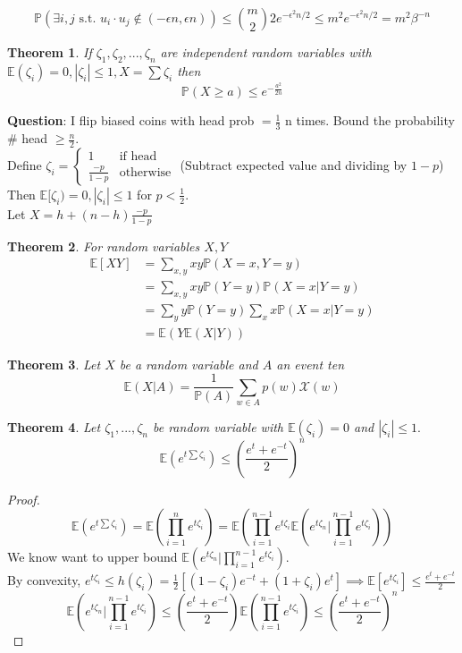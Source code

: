 \documentclass[a4paper]{article}
\newtheorem{thm}{Theorem}[section]
\begin{document}
$$\mathbb{P}(\exists i,j \text{ s.t. } u_i\cdot u_j\notin (-\epsilon n, \epsilon n ))\leq {m \choose 2}2e^{-\epsilon^2n/2}\leq m^2e^{-\epsilon^2n/2}=m^2\beta^{-n}$$
\begin{thm}
    If $\zeta_1,\zeta_2,...,\zeta_n$ are independent random variables with $\mathbb{E}(\zeta_i)=0,|\zeta_i|\leq 1,X=\sum\zeta_i$ then $$\mathbb{P}(X\geq a)\leq e^{-\frac{a^2}{2n}}$$
\end{thm}
\noindent \textbf{Question}: I flip biased coins with head prob $=\frac{1}{3}$ n times. Bound the probability $\#$ head $\geq \frac{n}{2}$. \\
Define $\zeta_i=\begin{cases}
    1 & \text{if head} \\ \frac{-p}{1-p} & \text{otherwise}
\end{cases}$ (Subtract expected value and dividing by $1-p$)
Then $\mathbb{E}[\zeta_i)=0,|\zeta_i|\leq 1$ for $p<\frac{1}{2}.$\\
Let $X=h+(n-h)\frac{-p}{1-p}$
\begin{thm} For random variables $X,Y$
\begin{align*}
    \mathbb{E}[XY]&=\sum_{x,y}xy\mathbb{P}(X=x,Y=y)\\
    &=\sum_{x,y}xy\mathbb{P}(Y=y)\mathbb{P}(X=x|Y=y) \\
    &=\sum_{y}y\mathbb{P}(Y=y)\sum_xx\mathbb{P}(X=x|Y=y)\\
    &=\mathbb{E}(Y\mathbb{E}(X|Y))
\end{align*}
\end{thm}
\begin{thm}
    Let $X$ be a random variable and $A$ an event ten $$\mathbb{E}(X | A)=\frac{1}{\mathbb{P}(A)}\sum_{w\in A}p(w)\mathcal{X}(w)$$
\end{thm}
\begin{thm}
    Let $\zeta_1,...,\zeta_n$ be random variable with $\mathbb{E}(\zeta_i)=0$ and $|\zeta_i|\leq 1.$
    $$\mathbb{E}(e^{t\sum\zeta_i})\leq \left (\frac{e^t+e^{-t}}{2} \right )^n$$
\end{thm}
\begin{proof}
        
    $$\mathbb{E}(e^{t\sum\zeta_i})= \mathbb{E}\left (\prod_{i=1}^n e^{t\zeta_i} \right )= \mathbb{E}\left (\prod_{i=1}^{n-1} e^{t\zeta_i}\mathbb{E}\left (e^{t\zeta_n } | \prod_{i=1}^{n-1}e^{t\zeta_i}\right )  \right )$$
    We know want to upper bound $\mathbb{E}\left (e^{t\zeta_n } | \prod_{i=1}^{n-1}e^{t\zeta_i}\right ).$\\
    By convexity, $e^{t\zeta_i}\leq h(\zeta_i)=\frac{1}{2}\left [(1-\zeta_i)e^{-t}+(1+\zeta_i)e^t\right ]\implies \mathbb{E}\left [e^{t\zeta_i} \right ]\leq \frac{e^t+e^{-t}}{2}$
    $$\mathbb{E}\left (e^{t\zeta_n } | \prod_{i=1}^{n-1}e^{t\zeta_i}\right )\leq \left ( \frac{e^t+e^{-t}}{2}\right ) \mathbb{E}\left (\prod_{i=1}^{n-1}e^{t\zeta_i} \right )\leq \left (\frac{e^t+e^{-t}}{2} \right )^n $$
    \end{proof}
\end{document}

